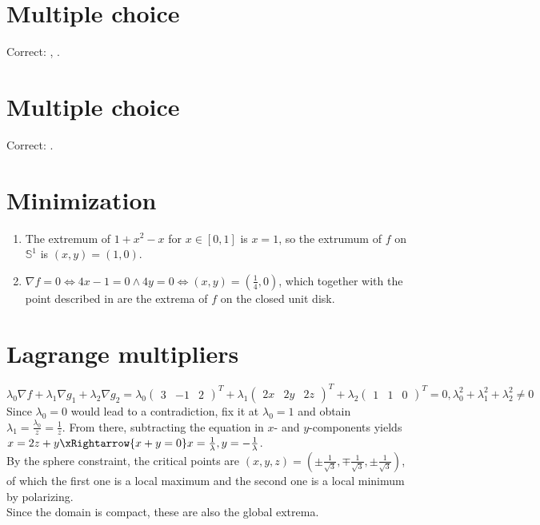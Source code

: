 \documentclass{article}
\begin{document}
\section{Multiple choice}
Correct: , .


\section{Multiple choice}
Correct: . 

\section{Minimization}
\begin{enumerate}[label=(\alph*)]
    \item The extremum of $1 + x^2 - x$ for $x \in [0, 1]$ is $x = 1$, so the extrumum of $f$ on $\mathbb{S}^1$ is $(x, y) = (1, 0)$. 
    
    \item $\nabla f = 0 \iff 4x - 1 = 0 \wedge 4y = 0 \iff (x, y) = \left(\frac{1}{4}, 0\right)$, which together with the point described in  are the extrema of $f$ on the closed unit disk. 
\end{enumerate}

\section{Lagrange multipliers}
$\lambda_0 \nabla f + \lambda_1 \nabla g_1 + \lambda_2 \nabla g_2 = \lambda_0 \begin{pmatrix}
    3 & -1 & 2
\end{pmatrix}^T + \lambda_1 \begin{pmatrix}
    2x & 2y & 2z 
\end{pmatrix}^T + \lambda_2 \begin{pmatrix}
    1 & 1 & 0
\end{pmatrix}^T = 0, \lambda_0^2 + \lambda_1^2 + \lambda_2^2 \neq 0$ \\

Since $\lambda_0 = 0$ would lead to a contradiction, fix it at $\lambda_0 = 1$ and obtain $\lambda_1 = \frac{\lambda_0}{z} = \frac{1}{z}$. From there, subtracting the equation in $x$- and $y$-components yields $x = 2z + y \xRightarrow{x + y = 0} x = \frac{1}{\lambda}, y = -\frac{1}{\lambda}$. \\
By the sphere constraint, the critical points are $(x, y, z) = \left(\pm \frac{1}{\sqrt{3}}, \mp \frac{1}{\sqrt{3}}, \pm \frac{1}{\sqrt{3}}\right)$, of which the first one is a local maximum and the second one is a local minimum by polarizing. \\
Since the domain is compact, these are also the global extrema.
\end{document}

